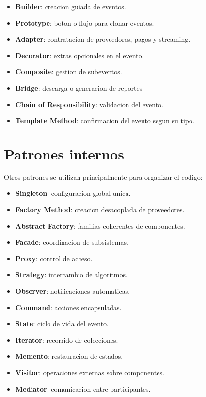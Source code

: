 \documentclass[12pt,a4paper]{article}
\begin{document}
\begin{itemize}[leftmargin=*]
    \item \textbf{Builder}: creacion guiada de eventos.
    \item \textbf{Prototype}: boton o flujo para clonar eventos.
    \item \textbf{Adapter}: contratacion de proveedores, pagos y streaming.
    \item \textbf{Decorator}: extras opcionales en el evento.
    \item \textbf{Composite}: gestion de subeventos.
    \item \textbf{Bridge}: descarga o generacion de reportes.
    \item \textbf{Chain of Responsibility}: validacion del evento.
    \item \textbf{Template Method}: confirmacion del evento segun su tipo.
\end{itemize}

\section{Patrones internos}

Otros patrones se utilizan principalmente para organizar el codigo:

\begin{itemize}[leftmargin=*]
    \item \textbf{Singleton}: configuracion global unica.
    \item \textbf{Factory Method}: creacion desacoplada de proveedores.
    \item \textbf{Abstract Factory}: familias coherentes de componentes.
    \item \textbf{Facade}: coordinacion de subsistemas.
    \item \textbf{Proxy}: control de acceso.
    \item \textbf{Strategy}: intercambio de algoritmos.
    \item \textbf{Observer}: notificaciones automaticas.
    \item \textbf{Command}: acciones encapsuladas.
    \item \textbf{State}: ciclo de vida del evento.
    \item \textbf{Iterator}: recorrido de colecciones.
    \item \textbf{Memento}: restauracion de estados.
    \item \textbf{Visitor}: operaciones externas sobre componentes.
    \item \textbf{Mediator}: comunicacion entre participantes.
\end{itemize}
\end{document}
